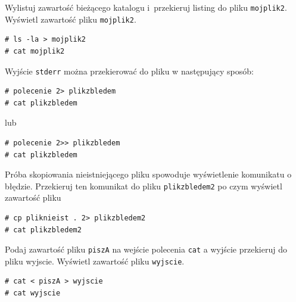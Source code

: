 \begin{example} 

Wylistuj zawartość bieżącego katalogu i~przekieruj listing do pliku \lstinline[style=MyBashStyle]{mojplik2}. Wyświetl zawartość pliku \lstinline[style=MyBashStyle]{mojplik2}. 

 
\begin{lstlisting}[style=MyBashStyle] 
# ls -la > mojplik2
# cat mojplik2
\end{lstlisting}

Wyjście \lstinline[style=MyBashStyle]{stderr} można przekierować do pliku w następujący sposób: 

\begin{lstlisting}[style=MyBashStyle] 
# polecenie 2> plikzbledem 
# cat plikzbledem
\end{lstlisting}

lub 

\begin{lstlisting}[style=MyBashStyle] 
# polecenie 2>> plikzbledem
# cat plikzbledem
\end{lstlisting}
\end{example} 

\begin{example} 

Próba skopiowania nieistniejącego pliku spowoduje wyświetlenie komunikatu o błędzie. Przekieruj ten komunikat do pliku \lstinline[style=MyBashStyle]{plikzbledem2} po czym wyświetl zawartość pliku

\begin{lstlisting}[style=MyBashStyle] 
# cp pliknieist . 2> plikzbledem2
# cat plikzbledem2
\end{lstlisting}
\end{example} 

\begin{example} 
Podaj zawartość pliku \lstinline[style=MyBashStyle]{piszA} na wejście polecenia \lstinline[style=MyBashStyle]{cat} a wyjście przekieruj do pliku wyjscie. Wyświetl zawartość pliku \lstinline[style=MyBashStyle]{wyjscie}.

\begin{lstlisting}[style=MyBashStyle] 
# cat < piszA > wyjscie
# cat wyjscie
\end{lstlisting}
\end{example} 

